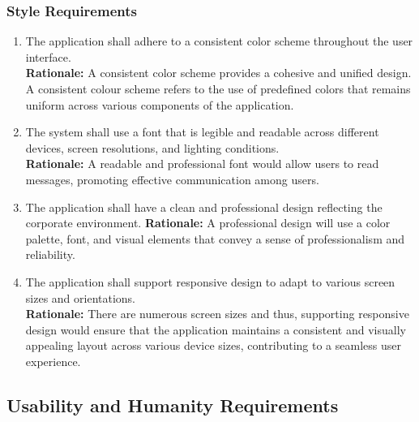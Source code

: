 \documentclass[]{article}
\begin{document}
\subsubsection{Style Requirements}
\label{ssub:style_requirements}
\begin{enumerate}[{LF-S}1. ]
	\item The application shall adhere to a consistent color scheme throughout the user interface. \\
	      {\bf Rationale:} A consistent color scheme provides a cohesive and unified design. A consistent colour scheme
	      refers to the use of predefined colors that remains uniform across various components of the application.
	\item The system shall use a font that is legible and readable across different devices, screen resolutions, and lighting conditions. \\
	      {\bf Rationale:} A readable and professional font would allow users to read messages, promoting effective communication among users.
	\item The application shall have a clean and professional design reflecting the corporate environment.
		      {\bf Rationale:} A professional design will use a color palette, font, and visual elements that convey a sense
	      of professionalism and reliability.
	\item The application shall support responsive design to adapt to various screen sizes and orientations. \\
	      {\bf Rationale:} There are numerous screen sizes and thus, supporting responsive design would ensure that the application
	      maintains a consistent and visually appealing layout across various device sizes, contributing to a seamless user experience.
\end{enumerate}

\subsection{Usability and Humanity Requirements}
\label{sub:usability_and_humanity_requirements}
\end{document}
